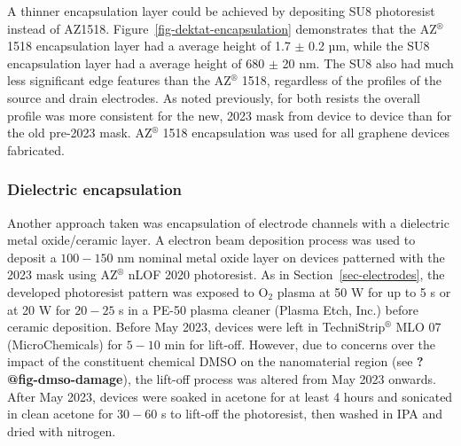 \documentclass[
  a4paper,
]{scrbook}
\begin{document}
A thinner encapsulation layer could be achieved by depositing SU8
photoresist instead of AZ1518. Figure~\ref{fig-dektat-encapsulation}
demonstrates that the AZ\(^\circledR\) 1518 encapsulation layer had a
average height of 1.7 \(\pm\) 0.2 µm, while the SU8 encapsulation layer
had a average height of 680 \(\pm\) 20 nm. The SU8 also had much less
significant edge features than the AZ\(^\circledR\) 1518, regardless of
the profiles of the source and drain electrodes. As noted previously,
for both resists the overall profile was more consistent for the new,
2023 mask from device to device than for the old pre-2023 mask.
AZ\(^\circledR\) 1518 encapsulation was used for all graphene devices
fabricated.

\hypertarget{dielectric-encapsulation}{%
\subsubsection*{Dielectric
encapsulation}\label{dielectric-encapsulation}}

Another approach taken was encapsulation of electrode channels with a
dielectric metal oxide/ceramic layer. A electron beam deposition process
was used to deposit a \(100-150\) nm nominal metal oxide layer on
devices patterned with the 2023 mask using AZ\(^\circledR\) nLOF 2020
photoresist. As in Section~\ref{sec-electrodes}, the developed
photoresist pattern was exposed to O\(_2\) plasma at 50 W for up to 5 s
or at 20 W for \(20-25\) s in a PE-50 plasma cleaner (Plasma Etch, Inc.)
before ceramic deposition. Before May 2023, devices were left in
TechniStrip\(^\circledR\) MLO 07 (MicroChemicals) for \(5-10\) min for
lift-off. However, due to concerns over the impact of the constituent
chemical DMSO on the nanomaterial region (see
\textbf{?@fig-dmso-damage}), the lift-off process was altered from May
2023 onwards. After May 2023, devices were soaked in acetone for at
least 4 hours and sonicated in clean acetone for \(30-60\) s to lift-off
the photoresist, then washed in IPA and dried with nitrogen.
\end{document}
